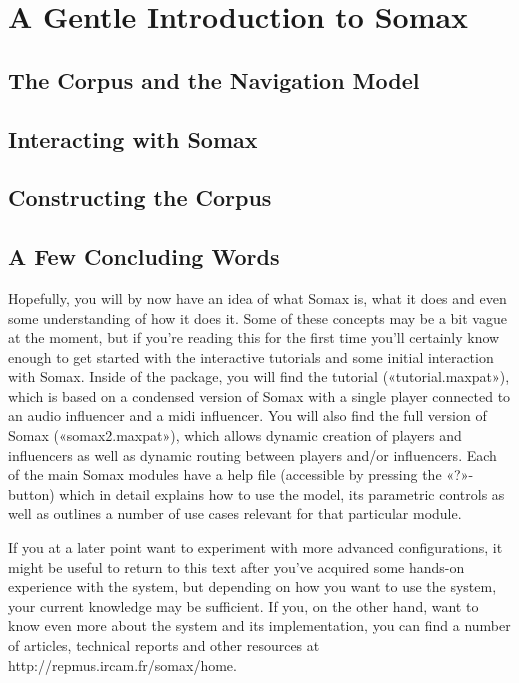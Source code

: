 \documentclass[11pt,a4paper]{report}
\begin{document}
\thispagestyle{empty}


\section*{A Gentle Introduction to Somax}




\subsection*{The Corpus and the Navigation Model}


\subsection*{Interacting with Somax}


\subsection*{Constructing the Corpus}

\pagebreak

\subsection*{A Few Concluding Words}
Hopefully, you will by now have an idea of what Somax is, what it does and even some understanding of how it does it. Some of these concepts may be a bit vague at the moment, but if you're reading this for the first time you'll certainly know enough to get started with the interactive tutorials and some initial interaction with Somax. Inside of the package, you will find the tutorial («tutorial.maxpat»), which is based on a condensed version of Somax with a single player connected to an audio influencer and a midi influencer. You will also find the full version of Somax («somax2.maxpat»), which allows dynamic creation of players and influencers as well as dynamic routing between players and/or influencers. Each of the main Somax modules have a help file (accessible by pressing the «?»-button) which in detail explains how to use the model, its parametric controls as well as outlines a number of use cases relevant for that particular module. 

If you at a later point want to experiment with more advanced configurations, it might be useful to return to this text after you've acquired some hands-on experience with the system, but depending on how you want to use the system, your current knowledge may be sufficient. If you, on the other hand, want to know even more about the system and its implementation, you can find a number of articles, technical reports and other resources at http://repmus.ircam.fr/somax/home.
\end{document}
